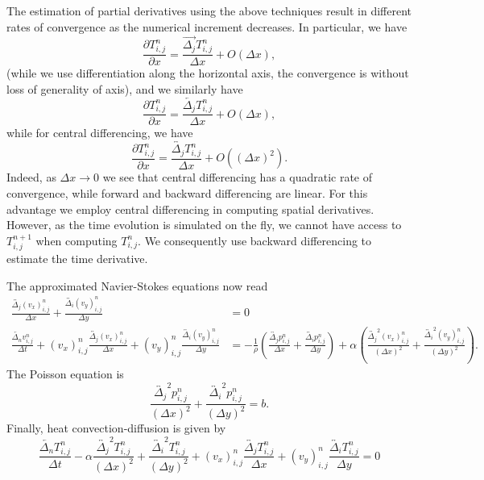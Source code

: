 \documentclass[12pt]{article}
\newcommand{\la}{\overleftarrow}
\newcommand{\ra}{\overrightarrow}
\newcommand{\ca}{\overleftrightarrow}
\begin{document}
The estimation of partial derivatives using the above techniques result in
different rates of convergence as the numerical increment decreases. In
particular, we have
\begin{equation}
    \frac{\partial T_{i,j}^n}{\partial x} = \frac{\ra{\Delta_j}T_{i,j}^n}{\Delta
    x}+ O(\Delta x),
    \label{eq:\theequation}
\end{equation}
(while we use differentiation along the horizontal axis, the
convergence is without loss of generality of axis), and we similarly have
\begin{equation}
    \frac{\partial T_{i,j}^n}{\partial x} = \frac{\la{\Delta_j}T_{i,j}^n}{\Delta
    x} + O(\Delta x),
    \label{eq:\theequation}
\end{equation}
while for central differencing, we have
\begin{equation}
     \frac{\partial T_{i,j}^n}{\partial x} = \frac{\ca{\Delta_j}T_{i,j}^n}{\Delta
    x} + O((\Delta x)^2).
    \label{eq:\theequation}
\end{equation}
Indeed, as $\Delta x \to 0$ we see that central differencing has a quadratic
rate of convergence, while forward and backward differencing are linear. For
this advantage we employ central differencing in computing spatial derivatives.
However, as the time evolution is simulated on the fly, we cannot have access to
$T_{i,j}^{n+1}$ when computing $T_{i,j}^n$. We consequently use backward
differencing to estimate the time derivative.

The approximated Navier-Stokes equations now read
\begin{align}
    \frac{\ca{\Delta_{j}}(v_x)_{i,j}^n}{\Delta x} +
    \frac{\ca{\Delta_{i}}(v_y)_{i,j}^n}{\Delta y} &= 0 \\
    \frac{\la{\Delta_n}v^{n}_{i,j}}{\Delta t} + (v_x)_{i,j}^{n}
    \frac{\ca{\Delta_{j}}(v_x)_{i,j}^n}{\Delta x} + (v_y)_{i,j}^n
    \frac{\ca{\Delta_{i}}(v_y)_{i,j}^n}{\Delta y} &=
    -\frac{1}{\rho} \left(  \frac{\ca{\Delta_j}p_{i,j}^n}{\Delta
    x}+\frac{\ca{\Delta_i}p_{i,j}^n}{\Delta y}  \right) + \alpha
    \left(\frac{\ca{\Delta_{j}}^2(v_x)_{i,j}^n}{(\Delta x)^2} + 
    \frac{\ca{\Delta_{i}}^2(v_y)_{i,j}^n}{(\Delta y)^2}
    \right).
\end{align}
The Poisson equation is 
\begin{equation}
    \frac{\ca{\Delta_{j}}^2p_{i,j}^n}{(\Delta x)^2} + 
    \frac{\ca{\Delta_{i}}^2p_{i,j}^n}{(\Delta y)^2}
    = b.
    \label{eq:\theequation}
\end{equation}
Finally, heat convection-diffusion is given by
\begin{equation}
    \frac{\la{\Delta_n}T_{i,j}^n}{\Delta t} - \alpha \frac{\ca{\Delta_{j}}^2T_{i,j}^n}{(\Delta x)^2} + 
    \frac{\ca{\Delta_{i}}^2T_{i,j}^n}{(\Delta y)^2} + (v_x)_{i,j}^n
    \frac{\ca{\Delta_{j}}T_{i,j}^n}{\Delta x} + (v_y)_{i,j}^n
    \frac{\ca{\Delta_{i}}T_{i,j}^n}{\Delta y} = 0
    \label{eq:\theequation}
\end{equation}
\end{document}
